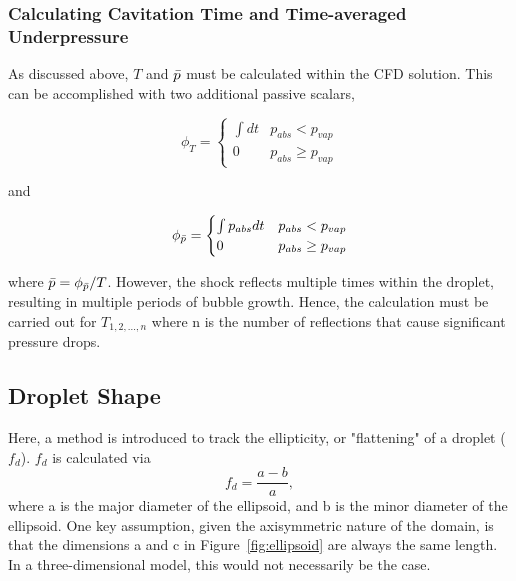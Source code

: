 \documentclass{UCF_ETD}
\begin{document}
\subsubsection{Calculating Cavitation Time and Time-averaged Underpressure}
\label{subsec:cav_time_and_underpressure}
As discussed above, $T$ and $\Bar{p}$ must be calculated within the CFD solution. This can be accomplished with two additional passive scalars, 

\begin{equation}
    \phi_{T} = \begin{cases}
        \int dt & p_{abs} < p_{vap}\\
        0 & p_{abs} \geq p_{vap}
    \end{cases}
    \label{eq:cavTimeScalar}
\end{equation}

\noindent and 

\begin{equation}
    \phi_{\Bar{p}} = \begin{cases}
        \int p_{abs} dt & p_{abs} < p_{vap}\\
        0 & p_{abs} \geq p_{vap}
    \end{cases}
    \label{eq:pbarscalar}
\end{equation}

\noindent where $\Bar{p} = \phi_{\Bar{p}}/T$.  However, the shock reflects multiple times within the droplet, resulting in multiple periods of bubble growth. Hence, the calculation must be carried out for $T_{1, 2,...,n}$ where n is the number of reflections that cause significant pressure drops.


\subsection{Droplet Shape}
\label{sec:dropShapeMethod}

Here, a method is introduced to track the ellipticity, or "flattening" of a droplet ($f_{d}$). $f_{d}$ is calculated via
\begin{equation}
    f_{d} = \frac{a-b}{a},
    \label{eq:flattening}
\end{equation}
\noindent where a is the major diameter of the ellipsoid, and b is the minor diameter of the ellipsoid. One key assumption, given the axisymmetric nature of the domain, is that the dimensions a and c in Figure~\ref{fig:ellipsoid} are always the same length. In a three-dimensional model, this would not necessarily be the case.
\end{document}
